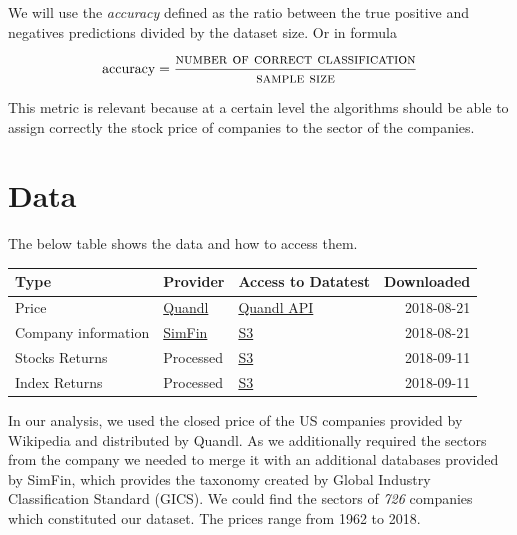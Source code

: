 \documentclass[a4paper,twoside]{article}
\begin{document}
We will use the \emph{accuracy} defined as the ratio between the true positive and
negatives predictions divided by the dataset size. Or in formula

\begin{align*}
  \textrm{accuracy} = \frac{\textsc{number of correct classification} }{\textsc{sample size}}
\end{align*}

This metric is relevant because at a certain level the algorithms should be
able to assign correctly the stock price of companies to the sector of the
companies.


\section{Data}
\label{sec:org2b16581}

The below table shows the data and how to access them.

\begin{center}
\begin{tabular}{lllr}
Type & Provider & Access to Datatest & Downloaded\\
\hline
Price & \href{https://www.quandl.com/databases/WIKIP/documentation/about}{Quandl} & \href{https://www.quandl.com/databases/WIKIP}{Quandl API} & 2018-08-21\\
Company information & \href{https://simfin.com/data/find/}{SimFin} & \href{https://s3.us-east-2.amazonaws.com/udacity-capstone-data-davidpham87/data/company\_fundamentals.csv}{S3} & 2018-08-21\\
Stocks Returns & Processed & \href{https://s3.us-east-2.amazonaws.com/udacity-capstone-data-davidpham87/data/wiki\_stocks\_returns.csv}{S3} & 2018-09-11\\
Index Returns & Processed & \href{https://s3.us-east-2.amazonaws.com/udacity-capstone-data-davidpham87/data/wiki\_indices\_returns.csv}{S3} & 2018-09-11\\
\hline
\end{tabular}
\end{center}

In our analysis, we used the closed price of the US companies provided by
Wikipedia and distributed by Quandl. As we additionally required the sectors
from the company we needed to merge it with an additional databases provided by
SimFin, which provides the taxonomy created by Global Industry Classification
Standard (GICS). We could find the sectors of \emph{726} companies which
constituted our dataset. The prices range from 1962 to 2018.
\end{document}
